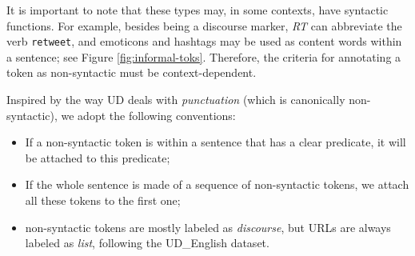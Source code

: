 \documentclass[11pt,a4paper]{article}
\newcommand{\yjcomment}[1]{\textcolor{orange}{[$_\mathrm{L}^\mathrm{Y}$#1]}}
\newcommand{\nascomment}[1]{\textcolor{blue}{[#1 ---\textsc{nas}]}}
\begin{document}
It is important to note that these types may, in some
contexts, have syntactic functions.
For example, besides being a discourse marker, \emph{RT} can
abbreviate the verb {\tt retweet}, and emoticons and hashtags may be
used as content words within a sentence; see  Figure
\ref{fig:informal-toks}.  Therefore, the criteria for annotating a
token as non-syntactic must be context-dependent.


Inspired by the way UD deals with \emph{punctuation} (which is
canonically non-syntactic), we adopt the following
conventions:
\begin{itemize}
\item If a non-syntactic token is within a sentence that has a clear predicate, it will be attached to this predicate;
\item If the whole sentence is made of a sequence of non-syntactic tokens, we attach all these tokens to the first one;
\item non-syntactic tokens are mostly labeled as {\it discourse}, but
  URLs are always labeled as {\it list}, following the UD\_English dataset.
\end{itemize}



\end{document}
